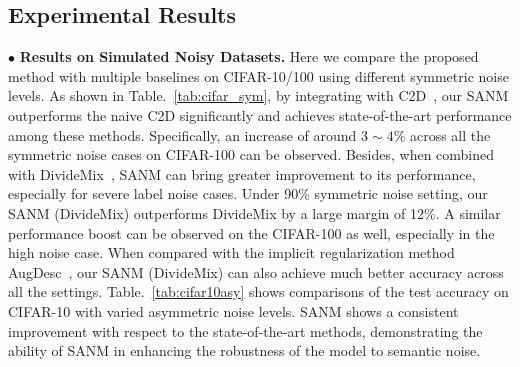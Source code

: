 \documentclass[10pt,twocolumn,letterpaper]{article}
\begin{document}
\subsection{Experimental Results}
\vspace{-.5em}
$\bullet$ \textbf{Results on Simulated Noisy Datasets.} Here we compare the proposed method with multiple baselines on CIFAR-10/100 using different symmetric noise levels. As shown in Table.~\ref{tab:cifar_sym}, by integrating with C2D~\cite{zheltonozhskii2022contrast}, our SANM outperforms the naive C2D significantly and achieves state-of-the-art performance among these methods. Specifically, an increase of around $3\sim4$\% across all the symmetric noise cases on CIFAR-100 can be observed. Besides, when combined with DivideMix~\cite{li2020dividemix}, SANM can bring greater improvement to its performance, especially for severe label noise cases. Under 90\% symmetric noise setting, our SANM (DivideMix) outperforms DivideMix by a large margin of 12\%. A similar performance boost can be observed on the CIFAR-100 as well, especially in the high noise case. When compared with the implicit regularization method AugDesc~\cite{nishi2021augmentation}, our SANM (DivideMix) can also achieve much better accuracy across all the settings. Table.~\ref{tab:cifar10asy} shows comparisons of the test accuracy on CIFAR-10 with varied asymmetric noise levels. SANM shows a consistent improvement with respect to the state-of-the-art methods, demonstrating the ability of SANM in enhancing the robustness of the model to semantic noise. 
\end{document}
